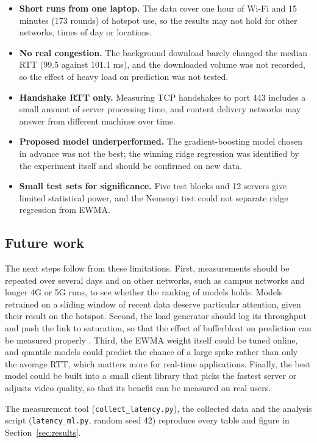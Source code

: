 \documentclass[pdflatex,sn-mathphys-num]{sn-jnl}
\begin{document}
\begin{itemize}
\item \textbf{Short runs from one laptop.} The data cover one hour of Wi-Fi and 15 minutes (173 rounds) of hotspot use, so the results may not hold for other networks, times of day or locations.
\item \textbf{No real congestion.} The background download barely changed the median RTT (99.5 against 101.1 ms), and the downloaded volume was not recorded, so the effect of heavy load on prediction was not tested.
\item \textbf{Handshake RTT only.} Measuring TCP handshakes to port 443 includes a small amount of server processing time, and content delivery networks may answer from different machines over time.
\item \textbf{Proposed model underperformed.} The gradient-boosting model chosen in advance was not the best; the winning ridge regression was identified by the experiment itself and should be confirmed on new data.
\item \textbf{Small test sets for significance.} Five test blocks and 12 servers give limited statistical power, and the Nemenyi test could not separate ridge regression from EWMA.
\end{itemize}

\subsection{Future work}\label{sec:future}

The next steps follow from these limitations. First, measurements should be repeated over several days and on other networks, such as campus networks and longer 4G or 5G runs, to see whether the ranking of models holds. Models retrained on a sliding window of recent data deserve particular attention, given their result on the hotspot. Second, the load generator should log its throughput and push the link to saturation, so that the effect of bufferbloat on prediction can be measured properly \cite{gettys2012bufferbloat,hoiland2016latency}. Third, the EWMA weight itself could be tuned online, and quantile models could predict the chance of a large spike rather than only the average RTT, which matters more for real-time applications. Finally, the best model could be built into a small client library that picks the fastest server or adjusts video quality, so that its benefit can be measured on real users.

\backmatter
{}
The measurement tool (\texttt{collect\_latency.py}), the collected data and the analysis script (\texttt{latency\_ml.py}, random seed 42) reproduce every table and figure in Section~\ref{sec:results}.

\end{document}

